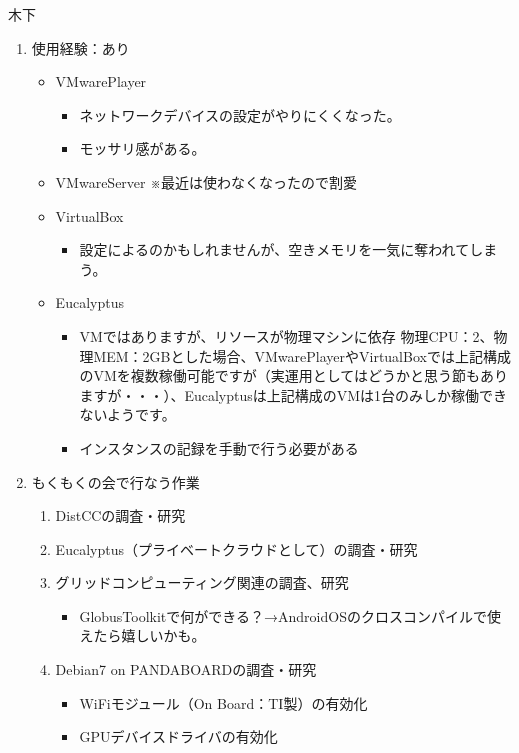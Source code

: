 \documentclass[mingoth,a4paper]{jsarticle}
\begin{document}
\begin{prework}{ 木下 }

 \begin{enumerate}
  \item 使用経験：あり
        \begin{itemize}
         \item VMwarePlayer
               \begin{itemize}
                \item ネットワークデバイスの設定がやりにくくなった。
                \item モッサリ感がある。
               \end{itemize}
         \item VMwareServer ※最近は使わなくなったので割愛
         \item VirtualBox
               \begin{itemize}
                \item 設定によるのかもしれませんが、空きメモリを一気に奪われてしまう。
               \end{itemize}
         \item Eucalyptus
               \begin{itemize}
                \item VMではありますが、リソースが物理マシンに依存
                      物理CPU：2、物理MEM：2GBとした場合、VMwarePlayerやVirtualBoxでは上記構成のVMを複数稼働可能ですが（実運用としてはどうかと思う節もありますが・・・）、Eucalyptusは上記構成のVMは1台のみしか稼働できないようです。
                \item インスタンスの記録を手動で行う必要がある
               \end{itemize}
        \end{itemize}

  \item もくもくの会で行なう作業
        \begin{enumerate}

         \item DistCCの調査・研究
         \item Eucalyptus（プライベートクラウドとして）の調査・研究
         \item グリッドコンピューティング関連の調査、研究
               \begin{itemize}
                \item  GlobusToolkitで何ができる？→AndroidOSのクロスコンパイルで使えたら嬉しいかも。
               \end{itemize}
         \item Debian7 on PANDABOARDの調査・研究
               \begin{itemize}
                \item WiFiモジュール（On Board：TI製）の有効化
                \item GPUデバイスドライバの有効化
               \end{itemize}
        \end{enumerate}


\end{enumerate}
\end{prework}
\end{document}
